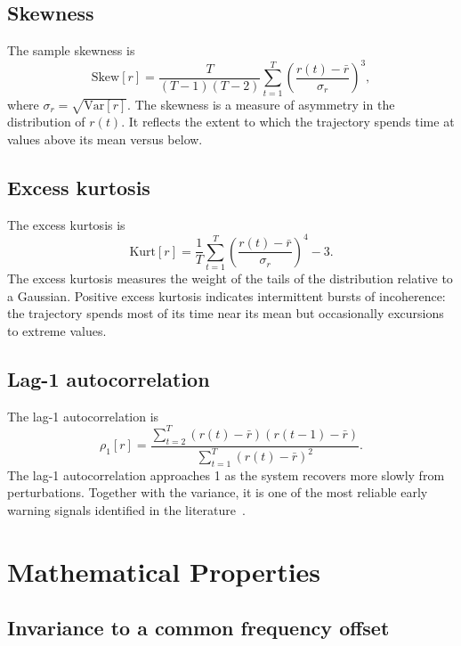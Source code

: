 \documentclass[11pt]{article}
\begin{document}
\subsection{Skewness}

The sample skewness is
\begin{equation}
\mathrm{Skew}[r] = \frac{T}{(T-1)(T-2)} \sum_{t=1}^{T}
\left( \frac{r(t) - \bar{r}}{\sigma_r} \right)^3,
\label{eq:skew}
\end{equation}
where $\sigma_r = \sqrt{\mathrm{Var}[r]}$. The skewness is a measure of
asymmetry in the distribution of $r(t)$. It reflects the extent to which
the trajectory spends time at values above its mean versus below.

\subsection{Excess kurtosis}

The excess kurtosis is
\begin{equation}
\mathrm{Kurt}[r] = \frac{1}{T} \sum_{t=1}^{T}
\left( \frac{r(t) - \bar{r}}{\sigma_r} \right)^4 - 3.
\label{eq:kurt}
\end{equation}
The excess kurtosis measures the weight of the tails of the
distribution relative to a Gaussian. Positive excess kurtosis indicates
intermittent bursts of incoherence: the trajectory spends most of its
time near its mean but occasionally excursions to extreme values.

\subsection{Lag-1 autocorrelation}

The lag-1 autocorrelation is
\begin{equation}
\rho_1[r] = \frac{\sum_{t=2}^{T} (r(t) - \bar{r})(r(t-1) - \bar{r})}
{\sum_{t=1}^{T} (r(t) - \bar{r})^2}.
\label{eq:lag1}
\end{equation}
The lag-1 autocorrelation approaches 1 as the system recovers more
slowly from perturbations. Together with the variance, it is one of the
most reliable early warning signals identified in the
literature~\cite{scheffer2009}.

\section{Mathematical Properties}\label{sec:properties}

\subsection{Invariance to a common frequency offset}
\end{document}
